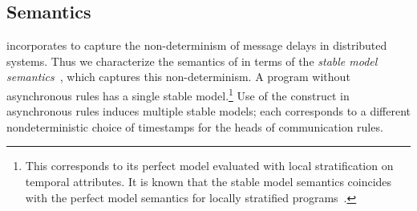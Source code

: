 
%


\subsection{Semantics}
\lang incorporates  to capture the non-determinism of message delays in distributed systems.  Thus we characterize the semantics of \lang  in terms of the {\em stable model semantics}~\cite{stable-model}, which captures this non-determinism.  A \lang program without asynchronous rules has a single stable model.\footnote{This corresponds to its perfect model evaluated with local stratification on temporal attributes.  It is known that the stable model semantics coincides with the perfect model semantics for locally stratified programs~\cite{stable-model}.}  Use of the  construct in asynchronous rules induces multiple stable models; each corresponds to a different nondeterministic choice of timestamps for the heads of communication rules.

